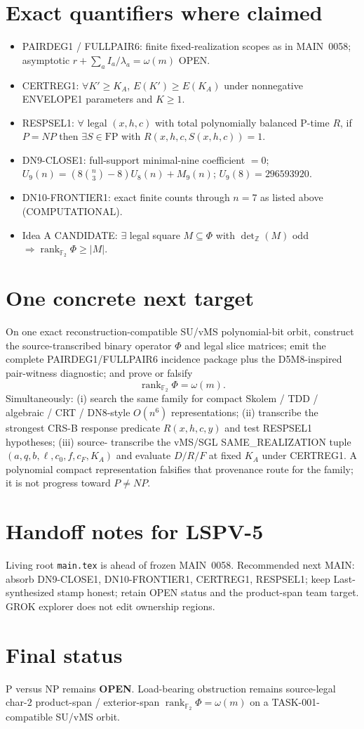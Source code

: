 \documentclass[11pt]{article}
\begin{document}
\section*{Exact quantifiers where claimed}
\begin{itemize}
\item PAIRDEG1 / FULLPAIR6: finite fixed-realization scopes as in MAIN~0058;
asymptotic $r+\sum_a I_a/\lambda_a=\omega(m)$ OPEN.
\item CERTREG1: $\forall K'\ge K_A$, $E(K')\ge E(K_A)$ under nonnegative
ENVELOPE1 parameters and $K\ge 1$.
\item RESPSEL1: $\forall$ legal $(x,h,c)$ with total polynomially balanced
P-time $R$, if $P=NP$ then $\exists S\in\mathrm{FP}$ with $R(x,h,c,S(x,h,c))=1$.
\item DN9-CLOSE1: full-support minimal-nine coefficient $=0$;
$U_9(n)=(8\binom{n}{3}-8)U_8(n)+M_9(n)$; $U_9(8)=296593920$.
\item DN10-FRONTIER1: exact finite counts through $n=7$ as listed above
(COMPUTATIONAL).
\item Idea A CANDIDATE: $\exists$ legal square $M\subseteq\Phi$ with
$\det_{\mathbb Z}(M)$ odd $\Rightarrow\operatorname{rank}_{\mathbb F_2}\Phi\ge|M|$.
\end{itemize}

\section*{One concrete next target}
On one exact reconstruction-compatible SU/vMS polynomial-bit orbit, construct the
source-transcribed binary operator $\Phi$ and legal slice matrices; emit the
complete PAIRDEG1/FULLPAIR6 incidence package plus the D5M8-inspired pair-witness
diagnostic; and prove or falsify
\[
\operatorname{rank}_{\mathbb F_2}\Phi=\omega(m).
\]
Simultaneously: (i) search the same family for compact Skolem / TDD / algebraic /
CRT / DN8-style $O(n^6)$ representations; (ii) transcribe the strongest CRS-B
response predicate $R(x,h,c,y)$ and test RESPSEL1 hypotheses; (iii) source-
transcribe the vMS/SGL SAME\_REALIZATION tuple
$(a,q,b,\ell,c_0,f,c_F,K_A)$ and evaluate $D/R/F$ at fixed $K_A$ under CERTREG1.
A polynomial compact representation falsifies that provenance route for the family;
it is not progress toward $P\neq NP$.

\section*{Handoff notes for LSPV-5}
Living root \texttt{main.tex} is ahead of frozen MAIN~0058. Recommended next MAIN:
absorb DN9-CLOSE1, DN10-FRONTIER1, CERTREG1, RESPSEL1; keep Last-synthesized stamp
honest; retain OPEN status and the product-span team target. GROK explorer does
not edit ownership regions.

\section*{Final status}
P versus NP remains \textbf{OPEN}. Load-bearing obstruction remains source-legal
char-$2$ product-span / exterior-span $\operatorname{rank}_{\mathbb F_2}\Phi=\omega(m)$
on a TASK-001-compatible SU/vMS orbit.
\end{document}
